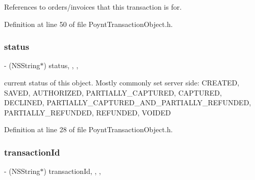 References to orders/invoices that this transaction is for. 



Definition at line 50 of file Poynt\+Transaction\+Object.\+h.

\hypertarget{interface_poynt_transaction_object_ac2acf327011ce6ed9e26a41ceddaee31}{}\label{interface_poynt_transaction_object_ac2acf327011ce6ed9e26a41ceddaee31} 
\subsubsection{\texorpdfstring{status}{status}}
{\footnotesize\ttfamily -\/ (N\+S\+String$\ast$) status\hspace{0.3cm}{\ttfamily [read]}, {\ttfamily [write]}, {\ttfamily [nonatomic]}, {\ttfamily [copy]}}



current status of this object. Mostly commonly set server side\+: \textquotesingle{}C\+R\+E\+A\+T\+ED\textquotesingle{}, \textquotesingle{}S\+A\+V\+ED\textquotesingle{}, \textquotesingle{}A\+U\+T\+H\+O\+R\+I\+Z\+ED\textquotesingle{}, \textquotesingle{}P\+A\+R\+T\+I\+A\+L\+L\+Y\+\_\+\+C\+A\+P\+T\+U\+R\+ED\textquotesingle{}, \textquotesingle{}C\+A\+P\+T\+U\+R\+ED\textquotesingle{}, \textquotesingle{}D\+E\+C\+L\+I\+N\+ED\textquotesingle{}, \textquotesingle{}P\+A\+R\+T\+I\+A\+L\+L\+Y\+\_\+\+C\+A\+P\+T\+U\+R\+E\+D\+\_\+\+A\+N\+D\+\_\+\+P\+A\+R\+T\+I\+A\+L\+L\+Y\+\_\+\+R\+E\+F\+U\+N\+D\+ED\textquotesingle{}, \textquotesingle{}P\+A\+R\+T\+I\+A\+L\+L\+Y\+\_\+\+R\+E\+F\+U\+N\+D\+ED\textquotesingle{}, \textquotesingle{}R\+E\+F\+U\+N\+D\+ED\textquotesingle{}, \textquotesingle{}V\+O\+I\+D\+ED\textquotesingle{} 



Definition at line 28 of file Poynt\+Transaction\+Object.\+h.

\hypertarget{interface_poynt_transaction_object_aacd11580c330a78310c344d78baecf8c}{}\label{interface_poynt_transaction_object_aacd11580c330a78310c344d78baecf8c} 
\subsubsection{\texorpdfstring{transaction\+Id}{transactionId}}
{\footnotesize\ttfamily -\/ (N\+S\+String$\ast$) transaction\+Id\hspace{0.3cm}{\ttfamily [read]}, {\ttfamily [write]}, {\ttfamily [nonatomic]}, {\ttfamily [copy]}}



